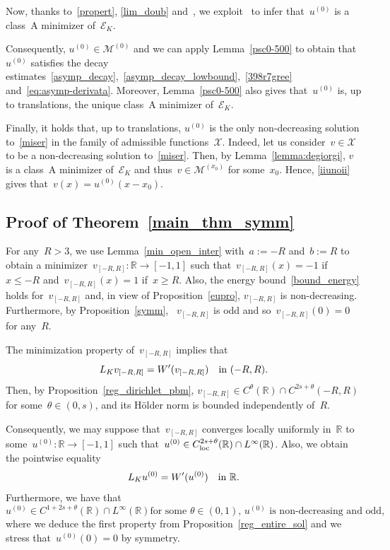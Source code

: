 \documentclass[10pt,a4paper]{amsart}
\numberwithin{equation}{section}
\newcommand{\R}{\mathbb{R}}
\newcommand{\Ec}{\mathcal{E}_K}
\begin{document}
Now, thanks to~\eqref{propert}, \eqref{lim_doub} and~\cite[Remark 2.7]{CP16}, we exploit~\cite[Theorem 3]{CP16} to infer that~$u^{(0)}$ is a class~A minimizer of~$\Ec$.

Consequently, $u^{(0)} \in \mathscr{M}^{(0)}$ and we can apply Lemma~\ref{psc0-500} to obtain that~$u^{(0)}$ satisfies the decay estimates~\eqref{asymp_decay},~\eqref{asymp_decay_lowbound},~\eqref{398r7gree} and~\eqref{eq:asymp-derivata}. Moreover, Lemma~\ref{psc0-500} also gives that~$u^{(0)}$ is, up to translations, the unique class~A minimizer of~$\Ec$.

Finally, it holds that, up to translations, $u^{(0)}$ is the only non-decreasing solution to~\eqref{miser} in the family of admissible functions~$\mathcal{X}$. Indeed, let us consider~$v \in \mathcal{X}$ to be a non-decreasing solution to~\eqref{miser}.  Then, by Lemma~\ref{lemma:degiorgi}, $v$ is a class~A minimizer of~$\Ec$ and thus~$v \in \mathscr{M}^{(x_0)}$ for some~$x_0$. Hence, \eqref{iiunoii} gives that~$v(x)= u^{(0)}(x-x_0)$.

\subsection*{Proof of Theorem~\ref{main_thm_symm}}
For any~$R>3$, we use Lemma~\ref{min_open_inter} with~$a:=-R$ and~$b:=R$ to obtain a minimizer~$v_{[-R,R]}: \R \to [-1,1]$ such that~$v_{[-R,R]}(x) = -1$ if~$x\leq-R$ and~$v_{[-R,R]}(x)=1$ if~$x \geq R$. Also, the energy bound~\eqref{bound_energy} holds for~$v_{[-R,R]}$ and, in view of Proposition~\ref{eupro}, $v_{[-R,R]}$ is non-decreasing. Furthermore, by Proposition~\ref{symm}, ~$v_{[-R,R]}$ is odd and so~$v_{[-R,R]}(0)=0$ for any~$R$.

The minimization property of~$v_{[-R,R]}$ implies that
\begin{equation*}
{L}_K v_{[-R,R]} = W\rq{}(v_{[-R,R]}) \quad\mbox{in }  (-R,R).
\end{equation*}
Then, by Proposition~\ref{reg_dirichlet_pbm}, $v_{[-R,R]} \in C^{\theta}(\R) \cap C^{2s+\theta}(-R,R)$ for some~$\theta \in (0,s)$, and its  H\"{o}lder norm is bounded independently of~$R$. 

Consequently, we may suppose that~$v_{[-R,R]}$ converges locally uniformly in~$\R$ to some~$u^{(0)}:\R \to [-1,1]$ such that~$u^{(0)}\in C_{{\rm loc}}^{2s+\theta}(\R) \cap L^{\infty}(\R)$. Also,
we obtain the pointwise equality
\begin{equation}\label{miser_symm}
{L}_K u^{(0)}= W\rq{}(u^{(0)}) \quad\mbox{in }\R.
\end{equation}
Furthermore, we have that
\begin{equation}\label{propert_symm}
{\mbox{$u^{(0)}\in C^{1+2s+\theta}(\R)\cap L^{\infty}(\R)$
for some~$\theta\in(0,1)$, $u^{(0)}$ is non-decreasing and odd,}}
\end{equation}
where we deduce the first property from Proposition~\ref{reg_entire_sol} and we stress that~$u^{(0)}(0)=0$ by symmetry. 
\end{document}
